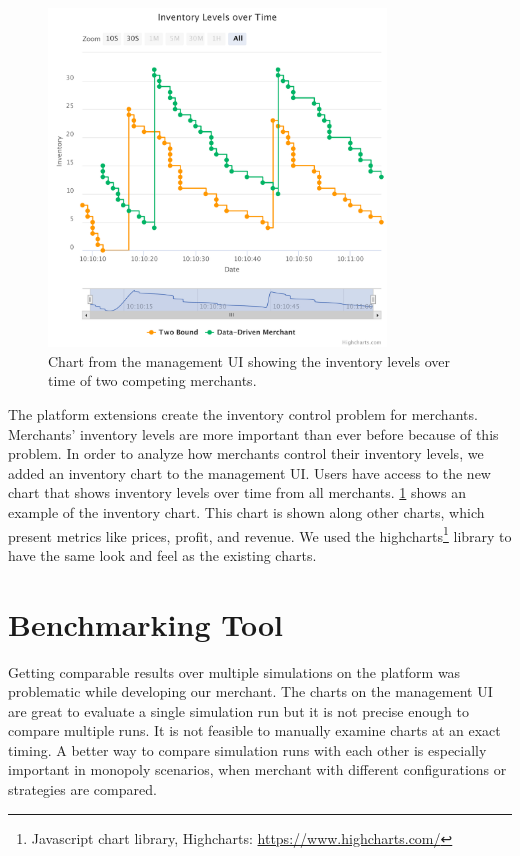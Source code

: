 \begin{figure}[t]
	\centering
	\includegraphics[width=0.8\textwidth]{figures/inventory_graph}
	\caption{Chart from the management UI showing the inventory levels over time of two competing merchants.}
	\label{fig:invnetory_graph}
\end{figure}

The platform extensions create the inventory control problem for merchants.
Merchants' inventory levels are more important than ever before because of this problem.
In order to analyze how merchants control their inventory levels, we added an inventory chart to the management UI.
Users have access to the new chart that shows inventory levels over time from all merchants.
\cref{fig:invnetory_graph} shows an example of the inventory chart.
This chart is shown along other charts, which present metrics like prices, profit, and revenue. 
We used the highcharts\footnote{Javascript chart library, Highcharts: \url{https://www.highcharts.com/}} library to have the same look and feel as the existing charts.

\section{Benchmarking Tool}
\label{section:benchmark_tool}
Getting comparable results over multiple simulations on the \pricewars platform was problematic while developing our merchant.
The charts on the management UI are great to evaluate a single simulation run but it is not precise enough to compare multiple runs.
It is not feasible to manually examine charts at an exact timing.
A better way to compare simulation runs with each other is especially important in monopoly scenarios, when merchant with different configurations or strategies are compared.

